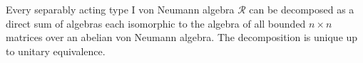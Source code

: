 Every separably acting type I von Neumann algebra $\mathcal{R}$ can be decomposed as a direct sum of algebras each isomorphic to the algebra of all bounded $n \times n$ matrices over an abelian von Neumann algebra. The decomposition is unique up to unitary equivalence.
